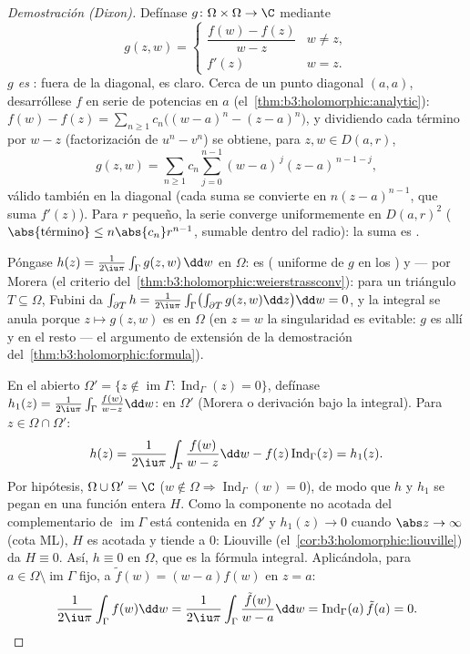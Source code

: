 \begin{proof}[Demostración (Dixon)]
Defínase $g \colon \Omega\times\Omega \to \C$ mediante
\[
g(z, w) = \begin{cases}
\dfrac{f(w) - f(z)}{w - z} & w \neq z,\\[4pt]
f'(z) & w = z .
\end{cases}
\]
\emph{$g$ es }: fuera de la
diagonal, es claro. Cerca de un punto diagonal $(a, a)$, desarróllese
$f$ en serie de potencias en $a$
(el~\cref{thm:b3:holomorphic:analytic}): $f(w) - f(z) =
\sum_{n\geq1}c_n\bigl((w-a)^n - (z-a)^n\bigr)$, y dividiendo cada
término por $w - z$ (factorización de $u^n - v^n$) se obtiene, para
$z, w \in D(a, r)$,
\[
g(z, w) =
\sum_{n\geq1}c_n\sum_{j=0}^{n-1}(w-a)^{\,j}(z-a)^{\,n-1-j},
\]
válido también en la diagonal (cada suma  se convierte en
$n(z-a)^{n-1}$, que suma $f'(z)$). Para $r$ pequeño, la serie converge
uniformemente en $D(a,r)^2$ ($\abs{\text{término}} \leq n\abs{c_n}r^{n-1}$,
sumable dentro del radio): la suma es
.

Póngase $h(z) = \frac1{2\iu\pi}\int_\Gamma g(z, w)\,\dd w$ en $\Omega$:
es 
( uniforme de $g$ en los
) y
 --- por Morera (el criterio
del~\cref{thm:b3:holomorphic:weierstrassconv}): para un triángulo
$T \subseteq \Omega$, Fubini da $\int_{\partial
T}h = \frac1{2\iu\pi}\int_\Gamma\bigl(\int_{\partial T}g(z,
w)\dd z\bigr)\dd w = 0$, y la integral  se anula porque
$z \mapsto g(z, w)$ es  en
$\Omega$ (en $z = w$ la singularidad es evitable: $g$ es
 allí y
 en el resto --- el argumento
de extensión de la demostración del~\cref{thm:b3:holomorphic:formula}).

En el abierto
$\Omega' = \{z \notin \operatorname{im}\Gamma
: \operatorname{Ind}_\Gamma(z) = 0\}$, defínase $h_1(z) =
\frac1{2\iu\pi}\int_\Gamma\frac{f(w)}{w - z}\dd w$:
 en $\Omega'$ (Morera o
derivación bajo la integral). Para $z \in \Omega\cap\Omega'$:
\[
h(z) = \frac1{2\iu\pi}\int_\Gamma\frac{f(w)}{w-z}\dd w
- f(z)\operatorname{Ind}_\Gamma(z) = h_1(z) .
\]
Por hipótesis, $\Omega\cup\Omega' = \C$ ($w \notin \Omega
\Rightarrow \operatorname{Ind}_\Gamma(w) = 0$), de modo que $h$ y $h_1$
se pegan en una función entera $H$. Como la componente no acotada del
complementario de $\operatorname{im}\Gamma$ está contenida en $\Omega'$
y $h_1(z) \to 0$ cuando $\abs z \to \infty$ (cota ML), $H$ es acotada y
tiende a $0$: Liouville (el~\cref{cor:b3:holomorphic:liouville}) da
$H \equiv 0$. Así, $h \equiv 0$ en $\Omega$, que es la fórmula integral.
Aplicándola, para $a \in
\Omega\setminus\operatorname{im}\Gamma$ fijo, a $\tilde f(w) =
(w - a)f(w)$ en $z = a$:
\[
\frac1{2\iu\pi}\int_\Gamma f(w)\dd w =
\frac1{2\iu\pi}\int_\Gamma \frac{\tilde f(w)}{w - a}\dd w =
\operatorname{Ind}_\Gamma(a)\,\tilde f(a) = 0 .
\]
\end{proof}

